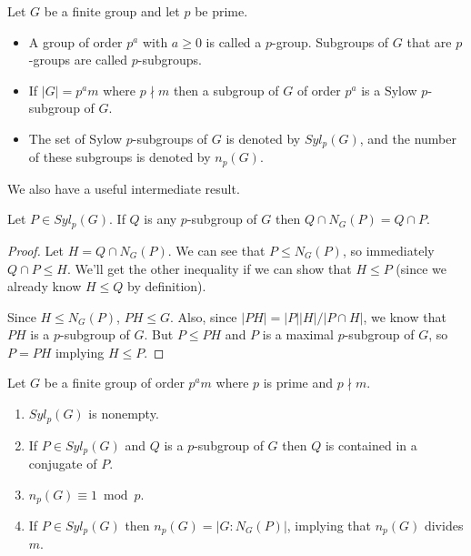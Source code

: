 \documentclass[../m171main.tex]{subfiles}
\begin{document}
\begin{definition}[$p$-group]
    Let $G$ be a finite group and let $p$ be prime.
    \begin{itemize}[topsep=0pt]
        \item A group of order $p^{a}$ with $a \geq 0$ is called a $p$-group.
        Subgroups of $G$ that are $p$-groups are called $p$-subgroups.

        \item If $|G| = p^{a} m$ where $p \nmid m$ then a subgroup of $G$ of order $p^{a}$ is a Sylow $p$-subgroup of $G$.
        
        \item The set of Sylow $p$-subgroups of $G$ is denoted by $Syl_p(G)$, and the number of these subgroups is denoted by $n_p(G)$.
    \end{itemize}
\end{definition}

We also have a useful intermediate result.

\begin{lemma}[]
    Let $P \in Syl_p(G)$.
    If $Q$ is any $p$-subgroup of $G$ then $Q \cap N_G(P) = Q \cap P$.
\end{lemma}

\begin{proof}
    Let $H = Q \cap N_G(P)$.
    We can see that $P \leq N_G(P)$, so immediately $Q \cap P \leq H$.
    We'll get the other inequality if we can show that $H \leq P$ (since we already know $H \leq Q$ by definition).

    Since $H \leq N_G(P)$, $PH \leq G$.
    Also, since $|PH| = |P| |H| / |P \cap H|$, we know that $PH$ is a $p$-subgroup of $G$.
    But $P \leq PH$ and $P$ is a maximal $p$-subgroup of $G$, so $P = PH$ implying $H \leq P$.
\end{proof}

\begin{theorem}
    Let $G$ be a finite group of order $p^{a}m$ where $p$ is prime and $p \nmid m$.
    \begin{enumerate}[label=(\alph*),topsep=0pt]
        \item $Syl_p(G)$ is nonempty.
        \item If $P \in Syl_p(G)$ and $Q$ is a $p$-subgroup of $G$ then $Q$ is contained in a conjugate of $P$.
        \item $n_p(G) \equiv 1 \bmod p$.
        \item If $P \in Syl_p(G)$ then $n_p(G) = |G : N_G(P)|$, implying that $n_p(G)$ divides $m$.
    \end{enumerate}
\end{theorem}
\end{document}

